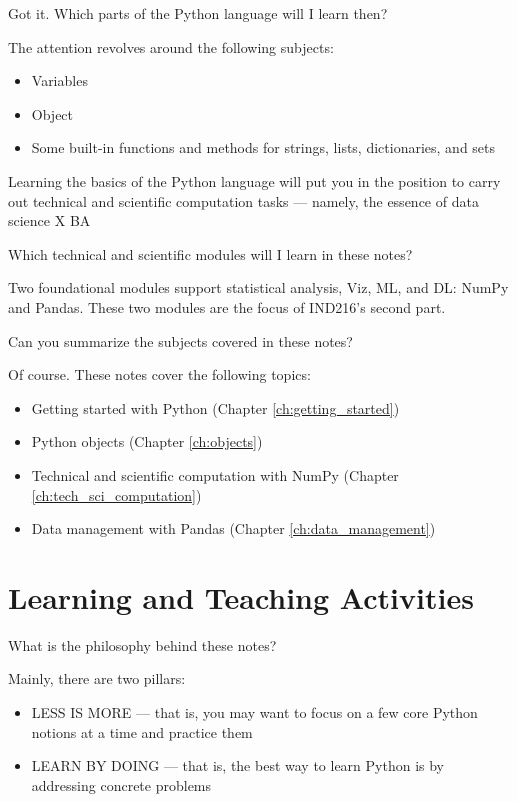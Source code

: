 \documentclass[a4paper,11pt]{book}
\newcommand{\question}[1]{%
    \begin{tcolorbox}[colback=comp_c!10,colframe=comp_c,sidebyside align=top,width=\linewidth,before skip=1ex]
        #1
    \end{tcolorbox}
    \switchcolumn%
}
\newcommand{\note}[1]{%
    \begin{tcolorbox}[colback=white!0,colframe=white!10,width=\linewidth,before skip=1ex]
        #1
    \end{tcolorbox}
}
\begin{document}
\begin{paracol}{2}
	\question{\raggedright Got it. Which parts of the Python language will I learn then?}
	\note{

	The attention revolves around the following subjects:

		\begin{itemize}
			\item Variables
			\item Object
			\item Some built-in functions and methods for strings, lists, dictionaries, and sets
		\end{itemize}
	
	\quad Learning the basics of the Python language will put you in the position to carry out technical and scientific computation tasks --- namely, the essence of data science X BA
	}
\end{paracol}

\begin{paracol}{2}
	\question{\raggedright Which technical and scientific modules will I learn in these notes?}
	\note{Two foundational modules support statistical analysis, Viz, ML, and DL: NumPy and Pandas. These two modules are the focus of IND216's second part.
	}
\end{paracol}

\begin{paracol}{2}
	\question{\raggedright Can you summarize the subjects covered in these notes?}
	\note{Of course. These notes cover the following topics:
	
	\begin{itemize}
		\item Getting started with Python (Chapter \ref{ch:getting_started})
		\item Python objects (Chapter \ref{ch:objects})
		\item Technical and scientific computation with NumPy (Chapter \ref{ch:tech_sci_computation})
		\item Data management with Pandas (Chapter \ref{ch:data_management})
	\end{itemize}
	}
\end{paracol}

\section{Learning and Teaching Activities}

\begin{paracol}{2}
	\question{\raggedright What is the philosophy behind these notes?}
	\note{Mainly, there are two pillars:
	
	\begin{itemize}
		\item LESS IS MORE --- that is, you may want to focus on a few core Python notions at a time and practice them
		\item LEARN BY DOING --- that is, the best way to learn Python is by addressing concrete problems
	\end{itemize}
	
	}
\end{paracol}
\clearpage
\end{document}

